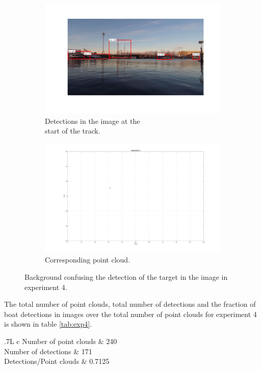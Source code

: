 \begin{figure}[H]
	\centering
	\begin{subfigure}[t]{.5\linewidth}
		\centering
		\includegraphics[width=\linewidth]{fig/ex4_miss.png}
		\caption{Detections in the image at the\\ start of the track.}
		\label{fig:sub_ex4_issue}
	\end{subfigure}%
	\begin{subfigure}[t]{.5\linewidth}
		\centering
		\includegraphics[width=\linewidth]{fig/ex4_miss_pc.png}
		\caption{Corresponding point cloud.}
		\label{fig:sub_ex4_issue2}
	\end{subfigure}
	\caption{Background confusing the detection of the target in the image in experiment 4.}
	\label{fig:issues_ex4}
\end{figure}
The total number of point clouds, total number of detections and the fraction of boat detections in images over the total number of point clouds for experiment 4 is shown in table \ref{tab:exp4}.
\begin{table}[H]
	\centering
	\begin{tabularx}{.7\linewidth}{L c}
		\toprule
		Number of point clouds & 240\\
		\midrule
		Number of detections & 171\\
		\midrule
		Detections/Point clouds & 0.7125 \\
		\bottomrule
	\end{tabularx}
	\caption{Data from experiment 4.}
	\label{tab:exp4}
\end{table}
